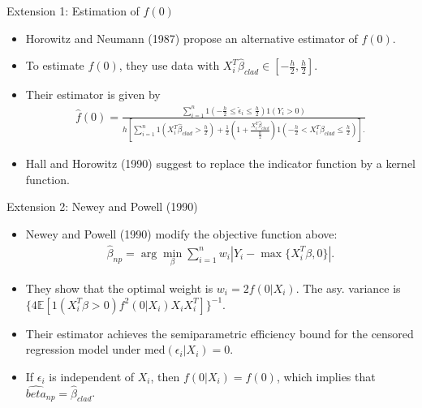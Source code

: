 \documentclass[xcolor=svgnames,dvipdfmx,cjk]{beamer}
\theoremstyle{example}
\def\med{\text{med}}
\def\E{\mathbb{E}}
\begin{document}
\begin{frame}{\alert{Extension 1}: Estimation of $f(0)$}
      \begin{itemize}
            \item Horowitz and Neumann (1987) propose an alternative estimator of $f(0)$.
            \item To estimate $f(0)$, they use data with 
                  $X_i^T \hat{\beta}_{clad} \in \left[ -\frac{h}{2}, \frac{h}{2} \right]$.
            \item Their estimator is given by 
                  {\tiny{
                  \begin{align*}
                        \hat{f}(0) = \frac{
                              \sum_{i=1}^n 
                              1\left(-\frac{h}{2}\leq \hat{\epsilon}_i \leq \frac{h}{2}\right) 
                              1\left(Y_i > 0\right)
                        }{
                              h \left[
                                    \sum_{i=1}^n 
                                    1(X_i^T \hat{\beta}_{clad} > \frac{h}{2}) 
                                    + \frac{1}{2} \left( 1 + \frac{X_i^T \hat{\beta}_{clad}}{\frac{h}{2}}\right)
                                    1\left(-\frac{h}{2} < X_i^T \hat{\beta}_{clad} \leq \frac{h}{2}\right)
                              \right].
                        }
                  \end{align*}
                  }}
            \item Hall and Horowitz (1990) suggest to replace the indicator function 
                  by a kernel function.
      \end{itemize}
\end{frame}

\begin{frame}{\alert{Extension 2}: Newey and Powell (1990)}
      \begin{itemize}
            \item Newey and Powell (1990) modify the objective function above:
                  \begin{align*}
                        \hat{\beta}_{np} 
                              = \arg\min_{\beta} 
                                \sum_{i=1}^n
                                w_i |Y_i - \max\{X_i^T \beta, 0\}|.
                  \end{align*}
            \item They show that the optimal weight is 
                  $w_i = 2 f(0|X_i)$.
                  The asy. variance is $\{ 4\E[1(X_i^T\beta>0) f^2(0|X_i)X_iX_i^T] \}^{-1}$.
            \item Their estimator achieves \alert{the semiparametric efficiency bound} 
                  for the censored regression model under $\med(\epsilon_i|X_i)=0$.
            \item If $\epsilon_i$ is independent of $X_i$, then $f(0|X_i) = f(0)$, 
                  which implies that $\hat{beta}_{np} = \hat{\beta}_{clad}$.
      \end{itemize}      
\end{frame}
\end{document}
